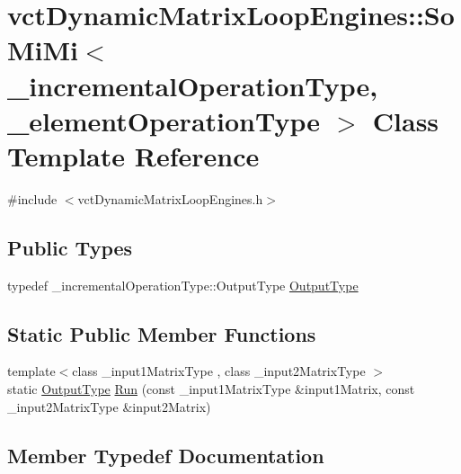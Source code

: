 \hypertarget{classvct_dynamic_matrix_loop_engines_1_1_so_mi_mi}{}\section{vct\+Dynamic\+Matrix\+Loop\+Engines\+:\+:So\+Mi\+Mi$<$ \+\_\+incremental\+Operation\+Type, \+\_\+element\+Operation\+Type $>$ Class Template Reference}
\label{classvct_dynamic_matrix_loop_engines_1_1_so_mi_mi}


{\ttfamily \#include $<$vct\+Dynamic\+Matrix\+Loop\+Engines.\+h$>$}

\subsection*{Public Types}
\begin{DoxyCompactItemize}
\item 
typedef \+\_\+incremental\+Operation\+Type\+::\+Output\+Type \hyperlink{classvct_dynamic_matrix_loop_engines_1_1_so_mi_mi_afc313c791e57a98048279521a3f18e78}{Output\+Type}
\end{DoxyCompactItemize}
\subsection*{Static Public Member Functions}
\begin{DoxyCompactItemize}
\item 
{\footnotesize template$<$class \+\_\+input1\+Matrix\+Type , class \+\_\+input2\+Matrix\+Type $>$ }\\static \hyperlink{classvct_dynamic_matrix_loop_engines_1_1_so_mi_mi_afc313c791e57a98048279521a3f18e78}{Output\+Type} \hyperlink{classvct_dynamic_matrix_loop_engines_1_1_so_mi_mi_a6cfefacd9d5f0ca541d3eb57d9538e72}{Run} (const \+\_\+input1\+Matrix\+Type \&input1\+Matrix, const \+\_\+input2\+Matrix\+Type \&input2\+Matrix)
\end{DoxyCompactItemize}


\subsection{Member Typedef Documentation}
\hypertarget{classvct_dynamic_matrix_loop_engines_1_1_so_mi_mi_afc313c791e57a98048279521a3f18e78}{}
